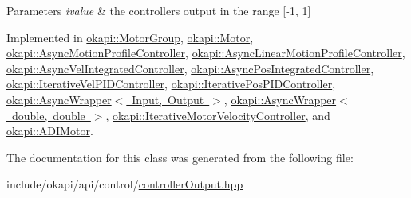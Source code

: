 \begin{DoxyParams}{Parameters}
{\em ivalue} & the controller\textquotesingle{}s output in the range \mbox{[}-\/1, 1\mbox{]} \\
\hline
\end{DoxyParams}


Implemented in \mbox{\hyperlink{classokapi_1_1MotorGroup_a9da308795bb956d5f7f3f7885a727d8e}{okapi\+::\+Motor\+Group}}, \mbox{\hyperlink{classokapi_1_1Motor_a262c36a80a942d125e574d691b77b440}{okapi\+::\+Motor}}, \mbox{\hyperlink{classokapi_1_1AsyncMotionProfileController_a292b22f53ed0ef67a479e00c92f68e3f}{okapi\+::\+Async\+Motion\+Profile\+Controller}}, \mbox{\hyperlink{classokapi_1_1AsyncLinearMotionProfileController_a45b62483002333a2d99deea8de2af43e}{okapi\+::\+Async\+Linear\+Motion\+Profile\+Controller}}, \mbox{\hyperlink{classokapi_1_1AsyncVelIntegratedController_ae50c09f44077284278e4d8a80656077d}{okapi\+::\+Async\+Vel\+Integrated\+Controller}}, \mbox{\hyperlink{classokapi_1_1AsyncPosIntegratedController_aaa8d694c814e7b419dfb55b3e3a1d72e}{okapi\+::\+Async\+Pos\+Integrated\+Controller}}, \mbox{\hyperlink{classokapi_1_1IterativeVelPIDController_a50c069752036261395871fbe175ae101}{okapi\+::\+Iterative\+Vel\+P\+I\+D\+Controller}}, \mbox{\hyperlink{classokapi_1_1IterativePosPIDController_ab77771ba39d01e5f8d29984fd43abd38}{okapi\+::\+Iterative\+Pos\+P\+I\+D\+Controller}}, \mbox{\hyperlink{classokapi_1_1AsyncWrapper_aec6d1a4214bad2151bee23dc5e8076e7}{okapi\+::\+Async\+Wrapper$<$ Input, Output $>$}}, \mbox{\hyperlink{classokapi_1_1AsyncWrapper_aec6d1a4214bad2151bee23dc5e8076e7}{okapi\+::\+Async\+Wrapper$<$ double, double $>$}}, \mbox{\hyperlink{classokapi_1_1IterativeMotorVelocityController_a5a36064df12b3d34f2bfa09ca1992b9e}{okapi\+::\+Iterative\+Motor\+Velocity\+Controller}}, and \mbox{\hyperlink{classokapi_1_1ADIMotor_ac290a47e904c728ff1e61ee85408a1be}{okapi\+::\+A\+D\+I\+Motor}}.



The documentation for this class was generated from the following file\+:\begin{DoxyCompactItemize}
\item 
include/okapi/api/control/\mbox{\hyperlink{controllerOutput_8hpp}{controller\+Output.\+hpp}}\end{DoxyCompactItemize}
